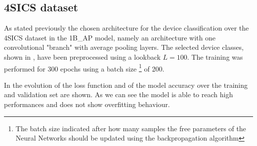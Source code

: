 \subsection{4SICS dataset}

As stated previously the chosen architecture for the device classification over the 4SICS dataset in the 1B\_AP model, namely an architecture with one convolutional "branch" with average pooling layers. The selected device classes, shown in , have been preprocessed using a lookback $L=100$. The training was performed for 300 epochs using a batch size \footnote{The batch size indicated after how many samples the free parameters of the Neural Networks should be updated using the backpropagation algorithm} of 200. 

In  the evolution of the loss function and of the model accuracy over the training and validation set are shown. As we can see the model is able to reach high performances and does not show overfitting behaviour. 


